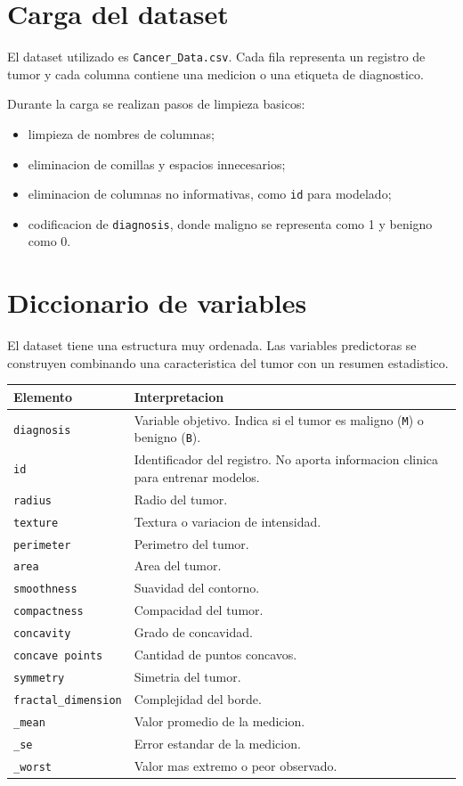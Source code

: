 \documentclass[12pt,letterpaper]{article}
\begin{document}
\section{Carga del dataset}

El dataset utilizado es \texttt{Cancer\_Data.csv}. Cada fila representa un registro de tumor y cada columna contiene una medicion o una etiqueta de diagnostico.

Durante la carga se realizan pasos de limpieza basicos:

\begin{itemize}[leftmargin=*]
    \item limpieza de nombres de columnas;
    \item eliminacion de comillas y espacios innecesarios;
    \item eliminacion de columnas no informativas, como \texttt{id} para modelado;
    \item codificacion de \texttt{diagnosis}, donde maligno se representa como 1 y benigno como 0.
\end{itemize}

\section{Diccionario de variables}

El dataset tiene una estructura muy ordenada. Las variables predictoras se construyen combinando una caracteristica del tumor con un resumen estadistico.

\begin{longtable}{p{}p{}}
\toprule
\textbf{Elemento} & \textbf{Interpretacion} \\
\midrule
\endhead
\texttt{diagnosis} & Variable objetivo. Indica si el tumor es maligno (\texttt{M}) o benigno (\texttt{B}). \\
\texttt{id} & Identificador del registro. No aporta informacion clinica para entrenar modelos. \\
\texttt{radius} & Radio del tumor. \\
\texttt{texture} & Textura o variacion de intensidad. \\
\texttt{perimeter} & Perimetro del tumor. \\
\texttt{area} & Area del tumor. \\
\texttt{smoothness} & Suavidad del contorno. \\
\texttt{compactness} & Compacidad del tumor. \\
\texttt{concavity} & Grado de concavidad. \\
\texttt{concave points} & Cantidad de puntos concavos. \\
\texttt{symmetry} & Simetria del tumor. \\
\texttt{fractal\_dimension} & Complejidad del borde. \\
\texttt{\_mean} & Valor promedio de la medicion. \\
\texttt{\_se} & Error estandar de la medicion. \\
\texttt{\_worst} & Valor mas extremo o peor observado. \\
\bottomrule
\end{longtable}
\end{document}
